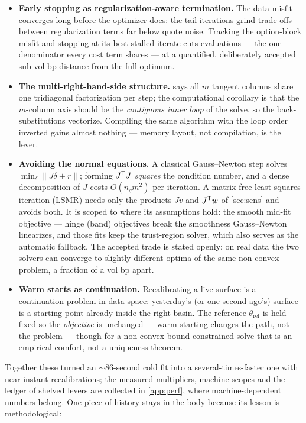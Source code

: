 \documentclass[11pt]{article}
\begin{document}
\begin{itemize}[leftmargin=1.4em]
\item \textbf{Early stopping as regularization-aware termination.}  The
data misfit converges long before the optimizer does: the tail iterations
grind trade-offs between regularization terms far below quote noise.
Tracking the option-block misfit and stopping at its best stalled iterate
cuts evaluations --- the one denominator every cost term shares --- at a
quantified, deliberately accepted sub-vol-bp distance from the full
optimum.
\item \textbf{The multi-right-hand-side structure.}
 says all $m$ tangent columns share one tridiagonal
factorization per step; the computational corollary is that the $m$-column
axis should be the \emph{contiguous inner loop} of the solve, so the
back-substitutions vectorize.  Compiling the same algorithm with the loop
order inverted gains almost nothing --- memory layout, not compilation,
is the lever.
\item \textbf{Avoiding the normal equations.}  A classical Gauss--Newton
step solves $\min_\delta\|J\delta+r\|$; forming $J^{\mathsf{T}} J$ \emph{squares} the
condition number, and a dense decomposition of $J$ costs $O(n_q m^{2})$
per iteration.  A matrix-free least-squares iteration (LSMR) needs only
the products $Jv$ and $J^{\mathsf{T}} w$ of \cref{sec:sens} and avoids both.  It is
scoped to where its assumptions hold: the smooth mid-fit objective ---
hinge (band) objectives break the smoothness Gauss--Newton linearizes,
and those fits keep the trust-region solver, which also serves as the
automatic fallback.  The accepted trade is stated openly: on real data the
two solvers can converge to slightly different optima of the same
non-convex problem, a fraction of a vol bp apart.
\item \textbf{Warm starts as continuation.}  Recalibrating a live surface
is a continuation problem in data space: yesterday's (or one second
ago's) surface is a starting point already inside the right basin.  The
reference $\theta_{\text{ref}}$ is held fixed so the \emph{objective} is
unchanged --- warm starting changes the path, not the problem --- though
for a non-convex bound-constrained solve that is an empirical comfort,
not a uniqueness theorem.
\end{itemize}
Together these turned an $\sim86$-second cold fit into a
several-times-faster one with near-instant recalibrations; the measured
multipliers, machine scopes and the ledger of shelved levers are collected
in \cref{app:perf}, where machine-dependent numbers belong.  One piece of
history stays in the body because its lesson is methodological:
\end{document}
